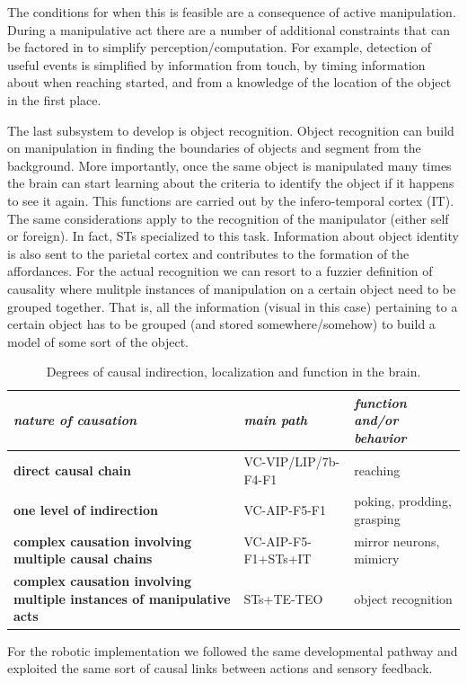 The conditions for when this is feasible are a consequence of active
manipulation. During a manipulative act there are a number of
additional constraints that can be factored in to simplify
perception/computation.  For example, detection of useful events is
simplified by information from touch, by timing information 
about when
reaching started, and from a knowledge of the location of the object in
the first place.

The last subsystem to develop is object recognition. Object 
recognition can build on manipulation in finding the boundaries
of objects and segment from the background. More importantly,
once the same object is manipulated many times the brain can
start learning about the criteria to identify the object if 
it happens to see it again. This functions are
carried out by the infero-temporal cortex (IT).
The same considerations apply to the recognition of the 
manipulator (either self or foreign). In fact, STs specialized
to this task. Information about object identity is
also sent to the parietal cortex and contributes to 
the formation of the affordances. For the actual recognition we 
can resort to a fuzzier definition
of causality where mulitple instances of manipulation on a 
certain object need to be grouped together. That is, all the 
information (visual in this case) pertaining to a certain object
has to be grouped (and stored somewhere/somehow) to build a model of some sort
of the object.

\begin{table}[htbp]
\begin{center}
\begin{tabular}{|p{3.5cm}|p{2.5cm}|p{4.5cm}|}
\hline
{\it nature of causation} & {\it main path} &  {\it function and/or behavior} \\ \hline\hline
{\bf direct causal chain} & VC-VIP/LIP/7b-F4-F1 & reaching\\ \hline
{\bf one level of indirection} & VC-AIP-F5-F1 & poking, prodding, grasping\\ \hline
{\bf complex causation involving multiple causal chains} & VC-AIP-F5-F1+STs+IT & mirror neurons, mimicry\\ \hline
{\bf complex causation involving multiple instances of manipulative acts} & STs+TE-TEO & object recognition\\ \hline
\end{tabular}
\caption{
\label{tab:circuits}
%
Degrees of causal indirection, localization and function in the brain.
%
}
\end{center}
\end{table}

For the robotic implementation we followed the same developmental
pathway and exploited the same sort of causal links between actions and 
sensory feedback.


